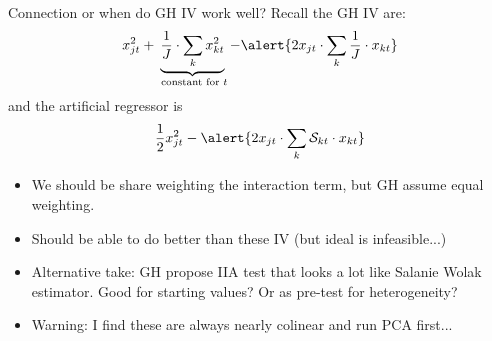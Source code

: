 \begin{frame}{Connection or when do GH IV work well?}
Recall the GH IV are:
\begin{align*}
x_{jt}^2 + \underbrace{\frac{1}{J} \cdot \sum_k x_{kt}^2}_{\text{ constant for } t } - \alert{2 x_{jt}  \cdot \sum_k  \frac{1}{J} \cdot x_{kt}}
\end{align*}
and the artificial regressor is
\begin{align*}
\frac{1}{2} x_{jt}^2 - \alert{2 x_{jt} \cdot \sum_k \mathcal{S}_{kt}  \cdot x_{kt}}
\end{align*}
\begin{itemize}
\item We should be \alert{share weighting} the interaction term, but GH assume equal weighting.\\
\item Should be able to do better than these IV (but ideal is infeasible...)
\item Alternative take: GH propose IIA test that looks a lot like Salanie Wolak estimator. Good for starting values? Or as pre-test for heterogeneity?
\item Warning: I find these are always nearly colinear and run PCA first...
\end{itemize}
\end{frame}









